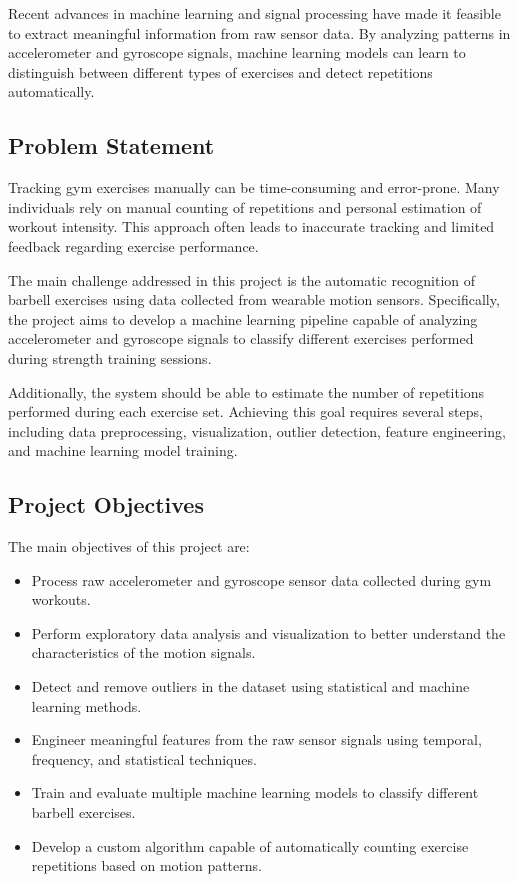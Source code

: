 \documentclass[12pt,a4paper]{article}
\begin{document}
Recent advances in machine learning and signal processing have made it feasible to extract meaningful information from raw sensor data. By analyzing patterns in accelerometer and gyroscope signals, machine learning models can learn to distinguish between different types of exercises and detect repetitions automatically.

\subsection{Problem Statement}

Tracking gym exercises manually can be time-consuming and error-prone. Many individuals rely on manual counting of repetitions and personal estimation of workout intensity. This approach often leads to inaccurate tracking and limited feedback regarding exercise performance.

The main challenge addressed in this project is the automatic recognition of barbell exercises using data collected from wearable motion sensors. Specifically, the project aims to develop a machine learning pipeline capable of analyzing accelerometer and gyroscope signals to classify different exercises performed during strength training sessions.

Additionally, the system should be able to estimate the number of repetitions performed during each exercise set. Achieving this goal requires several steps, including data preprocessing, visualization, outlier detection, feature engineering, and machine learning model training.

\subsection{Project Objectives}

The main objectives of this project are:

\begin{itemize}

\item Process raw accelerometer and gyroscope sensor data collected during gym workouts.

\item Perform exploratory data analysis and visualization to better understand the characteristics of the motion signals.

\item Detect and remove outliers in the dataset using statistical and machine learning methods.

\item Engineer meaningful features from the raw sensor signals using temporal, frequency, and statistical techniques.

\item Train and evaluate multiple machine learning models to classify different barbell exercises.

\item Develop a custom algorithm capable of automatically counting exercise repetitions based on motion patterns.

\end{itemize}
\end{document}
